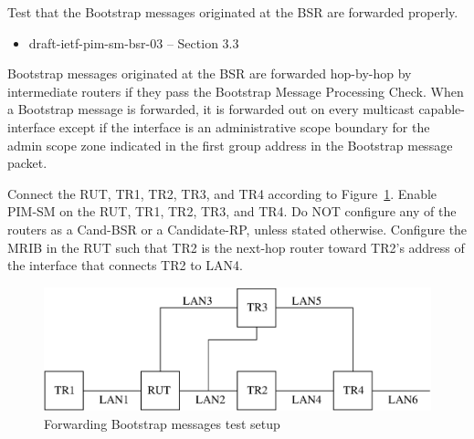 \documentclass[11pt]{report}
\begin{document}
Test that the Bootstrap messages originated at the BSR are forwarded properly.


\begin{itemize}
  \item draft-ietf-pim-sm-bsr-03 -- Section 3.3
\end{itemize}

Bootstrap messages originated at the BSR are forwarded hop-by-hop by
intermediate routers if they pass the Bootstrap Message Processing Check.
When a Bootstrap message is forwarded, it is forwarded out on every multicast
capable-interface except if the interface is an administrative scope boundary
for the admin scope zone indicated in the first group address in the Bootstrap
message packet.

Connect the RUT, TR1, TR2, TR3, and TR4 according to
Figure~\ref{fig:pim_test_6_5_forwarding_bootstrap_messages}.
Enable PIM-SM on the RUT, TR1, TR2, TR3, and TR4.
Do NOT configure any of the routers as a Cand-BSR or a Candidate-RP,
unless stated otherwise.
Configure the MRIB in the RUT such that TR2 is the next-hop router toward
TR2's address of the interface that connects TR2 to LAN4.


\begin{figure}[htbp]
  \begin{center}
    \includegraphics[scale=0.8]{figs/pim_test_6_5_forwarding_bootstrap_messages}
    \caption{Forwarding Bootstrap messages test setup}
    \label{fig:pim_test_6_5_forwarding_bootstrap_messages}
  \end{center}
\end{figure}


\end{document}
